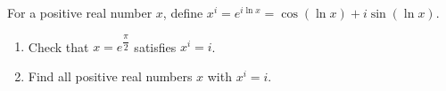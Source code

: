 For a positive real number $x$, define $x^i=e^{i\ln x}=\cos(\ln x)+i\sin(\ln x)$.
\begin{enumerate}
\item[(a)] Check that $x=e^{\dfrac{\pi}{2}}$ satisfies $x^i=i$.
\item[(b)] Find all positive real numbers $x$ with $x^i=i$.
\end{enumerate}
